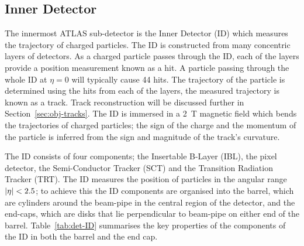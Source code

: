 
\subsection{Inner Detector}
\label{sec:det-ID}

The innermost ATLAS sub-detector is the Inner Detector (ID) which
measures the trajectory of charged particles.
The ID is constructed from many concentric layers of detectors.
As a charged particle passes through the ID, each of the layers provide a position measurement known as a hit.
A particle passing through the whole ID at $\eta=0$ will typically cause 44 hits. %
The trajectory of the particle is determined using the hits from each of the layers,
the measured trajectory is known as a track. Track reconstruction will be discussed further in Section~\ref{sec:obj-tracks}.
The ID is immersed in a 2~T magnetic field which bends the trajectories of charged particles;
the sign of the charge and the momentum of the particle is inferred from the sign and magnitude of the track's curvature.

The ID consists of four components; the Insertable B-Layer (IBL), the pixel detector, %
the Semi-Conductor Tracker (SCT) and the Transition Radiation Tracker (TRT).
The ID measures the position of particles in the angular range $|\eta|\nobreak<\nobreak2.5$;
to achieve this the ID components are organised into the barrel, which are cylinders around the beam-pipe in the central region %
of the detector, and the end-caps, which are disks that lie perpendicular to beam-pipe on either end of the barrel.
Table~\ref{tab:det-ID} summarises the key properties of the components of the ID in both the barrel and the end cap.

